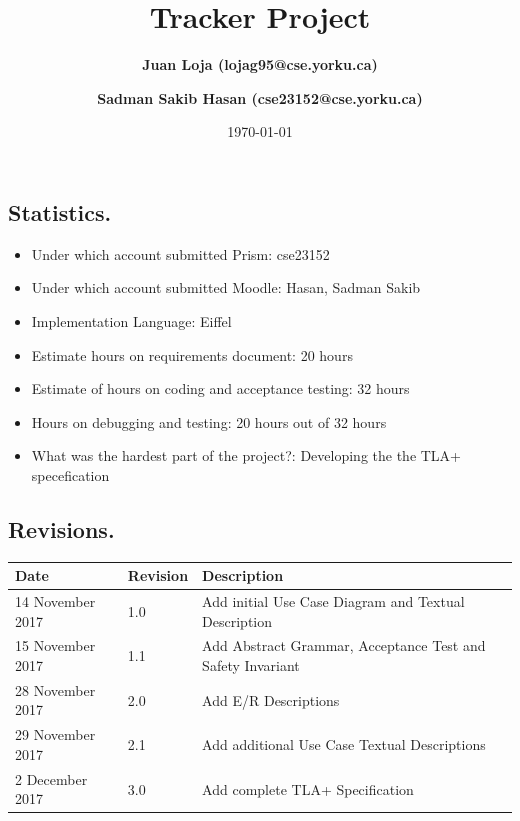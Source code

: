 \newcommand{\mytitle}{Tracker Project }
\ihead[]{\small \mytitle}
\title{\mytitle}

\author{\textbf{Juan Loja (lojag95@cse.yorku.ca)}
\and \textbf{Sadman Sakib Hasan (cse23152@cse.yorku.ca)}
}
\date{\today} %
\maketitle

\subsection*{Statistics.}
\begin{itemize}
\itemsep0em 
  \item Under which account submitted Prism: cse23152
  \item Under which account submitted Moodle: Hasan, Sadman Sakib
  \item Implementation Language: Eiffel
  \item Estimate hours on requirements document: 20 hours
  \item Estimate of hours on coding and acceptance testing: 32 hours
  \item Hours on debugging and testing: 20 hours out of 32 hours
  \item What was the hardest part of the project?: Developing the the TLA+ specefication
\end{itemize}


\subsection*{Revisions.}

\begin{tabular}{|l|l|p{3in}|}
\hline
Date & Revision & Description \\ 
\hline
14 November  2017
& 1.0
& Add initial Use Case Diagram and Textual Description\\ 
\hline
15 November  2017
& 1.1
& Add Abstract Grammar, Acceptance Test and Safety Invariant\\ 
\hline
28 November  2017
& 2.0
& Add E/R Descriptions\\ 
\hline
29 November  2017
& 2.1
& Add additional Use Case Textual Descriptions\\ 
\hline
2 December  2017
& 3.0
& Add complete TLA+ Specification\\ 
\hline
\end{tabular}

